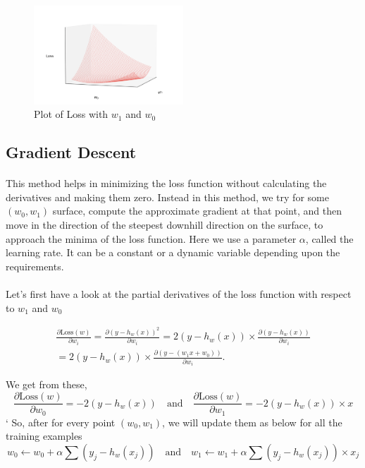 \documentclass{article}
\begin{document}
            \begin{figure}[H]
		\centering
		\includegraphics[width=0.5\textwidth]{plot.png}
		\caption{Plot of Loss with $w_1$ and $w_0$}
	       \end{figure}

    \subsection{Gradient Descent}
        \paragraph{}
            This method helps in minimizing the loss function without calculating the derivatives and making them zero. Instead in this method, we try for some $(w_0, w_1)$ surface, compute the approximate gradient at that point, and then move in the direction of the steepest downhill direction on the surface, to approach the minima of the loss function. Here we use a parameter $\alpha$, called the learning rate. It can be a constant or a dynamic variable depending upon the requirements.

        \paragraph{}
            Let’s first have a look at the partial derivatives of the loss function with respect to $w_1$ and $w_0$

            \begin{align*}
                \frac{\partial \text{Loss}(w)}{\partial w_i} = \frac{\partial (y - h_w(x))^2}{\partial w_i} = 2(y - h_w(x)) \times \frac{\partial (y - h_w(x))}{\partial w_i} \\
                = 2(y - h_w(x)) \times \frac{\partial (y - (w_1 x + w_0))}{\partial w_i}. \label{1}
            \end{align*}

            We get from these, 
            \begin{equation*}
                \frac{\partial \text{Loss}(w)}{\partial w_0} = -2(y - h_w(x)) \quad \text{and} \quad  \frac{\partial \text{Loss}(w)}{\partial w_1} = -2(y - h_w(x)) \times x
            \end{equation*}`
            So, after for every point $(w_0, w_1)$, we will update them as below for all the training examples
                \begin{equation*}
                    w_0 \leftarrow w_0 + \alpha \sum (y_j - h_w(x_j))
 \quad \text{and} \quad w_1 \leftarrow w_1 + \alpha \sum (y_j - h_w(x_j)) \times x_j
                \end{equation*}
\end{document}
